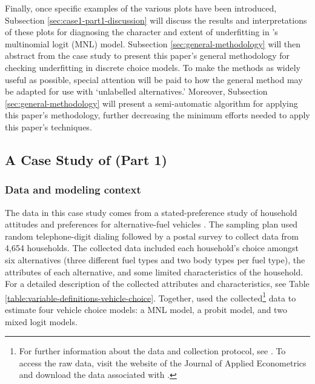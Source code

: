 \documentclass[preprint]{elsarticle}
\begin{document}
Finally, once specific examples of the various plots have been introduced, Subsection \ref{sec:case1-part1-discussion} will discuss the results and interpretations of these plots for diagnosing the character and extent of underfitting in \citet{brownstone_forecasting_1998}'s multinomial logit (MNL) model. Subsection \ref{sec:general-methodology} will then abstract from the case study to present this paper's general methodology for checking underfitting in discrete choice models. To make the methods as widely useful as possible, special attention will be paid to how the general method may be adapted for use with `unlabelled alternatives.' Moreover, Subsection \ref{sec:general-methodology} will present a semi-automatic algorithm for applying this paper's methodology, further decreasing the minimum efforts needed to apply this paper's techniques.

\subsection{A Case Study of \citet{brownstone_forecasting_1998} (Part 1)}
\label{sec:case1-part1}

\subsubsection{Data and modeling context}
\label{sec:case1-part1-data}
The data in this case study comes from a stated-preference study of household attitudes and preferences for alternative-fuel vehicles \citep{brownstone_forecasting_1998, brownstone_transactions_1996}. The sampling plan used random telephone-digit dialing followed by a postal survey to collect data from 4,654 households. The collected data included each household's choice amongst six alternatives (three different fuel types and two body types per fuel type), the attributes of each alternative, and some limited characteristics of the household. For a detailed description of the collected attributes and characteristics, see Table \ref{table:variable-definitions-vehicle-choice}. Together, \citeauthor{brownstone_forecasting_1998} used the collected\footnote{For further information about the data and collection protocol, see \citet{brownstone_forecasting_1998, brownstone_transactions_1996}. To access the raw data, visit the website of the Journal of Applied Econometrics and download the data associated with \citet{mcfadden_mixed_2000}.} data to estimate four vehicle choice models: a MNL model, a probit model, and two mixed logit models.
\end{document}
